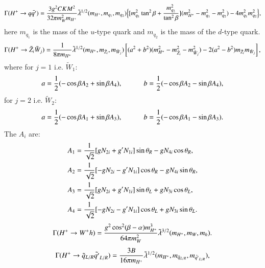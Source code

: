\documentclass[final,3p,times,pdflatex]{elsarticle}
\begin{document}
\begin{equation}\label{Hpmqq}
\Gamma(H^+ \rightarrow q \bar{q'}) = {3 g^2 CKM^2 \over 32 \pi m_{W}^2 m_{H^+}} \tilde{\lambda}^{1/2}(m_{H^+},m_{q_1}, m_{q_2}) \Big\{[m_{q_1}^2 \tan^2 \beta + {m_{q_2}^2  \over \tan^2 \beta}] (m_{H^+}^2 - m_{q_1}^2 - m_{q_2}^2) - 4m_{q_1}^2 m_{q_2}^2\Big\},
\end{equation} 
here $m_{q_1}$ is the mass of the $u$-type quark and $m_{q_2}$ is the mass of the $d$-type quark.
\begin{equation}\label{Hpmneutch}
\Gamma(H^+ \rightarrow \tilde{Z}_i \tilde{W}_j) = {1 \over 8 \pi m_{H^+}} \tilde{\lambda}^{1/2}(m_{H^+},m_{\tilde{Z}_i}, m_{\tilde{W}_j})\left[(a^2 + b^2)(m_{H^+}^2 - m_{\tilde{Z}_i}^2 - m_{\tilde{W}_j}^2) -2(a^2 -b^2)m_{\tilde{Z}_i}m_{\tilde{W}_j}\right],
\end{equation} 
where
for $j=1$ i.e. $\tilde{W}_{1}$:
\begin{equation}
a = {1 \over 2} (-\cos\beta A_2 + \sin\beta A_4), \quad \quad \quad
b = {1 \over 2} (-\cos\beta A_2 - \sin\beta A_4),
\end{equation}
for $j=2$ i.e. $\tilde{W}_{2}$:
\begin{equation}
a = {1 \over 2}(-\cos\beta A_1 + \sin\beta A_3), \quad \quad \quad
b = {1 \over 2}(-\cos\beta A_1 - \sin\beta A_3).
\end{equation}
The $A_{i}$ are:
\begin{align}
A_1 &= {1 \over \sqrt{2}}[g N_{2i} + g' N_{1i}]\sin \theta_R - gN_{4i} \cos\theta_R ,\\
A_2 &= {1 \over \sqrt{2}}[-g N_{2i} - g' N_{1i}]\cos \theta_R - gN_{4i} \sin\theta_R, \\
A_3 &= {1 \over \sqrt{2}}[g N_{2i} + g' N_{1i}]\sin \theta_L + gN_{3i} \cos\theta_L, \\
A_4 &= {1 \over \sqrt{2}}[-g N_{2i} - g' N_{1i}]\cos \theta_L + gN_{3i} \sin\theta_L.
\end{align}
\begin{equation}\label{HpmWh}
\Gamma(H^+ \rightarrow W^+ h) = {g^2 \cos^2 (\beta-\alpha) m_{H^+}^3 \over 64 \pi m_{W}^2} \tilde{\lambda}^{3/2}(m_{H^+},m_W,m_h).
\end{equation} 
\begin{equation} \label{Hpmeqsq1}
\Gamma(H^+ \rightarrow \tilde{q}_{L/R} \tilde{q'}_{L/R}) = {3 B \over 16 \pi m_{H^+}} \tilde{\lambda}^{1/2}(m_{H^+},m_{\tilde{q}_{L/R}}, m_{\tilde{q'}_{L/R}}), 
\end{equation} 
\end{document}
